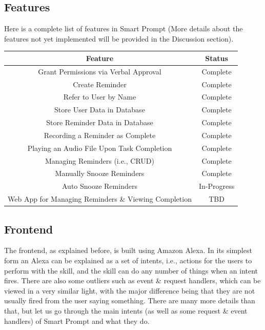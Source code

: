 \documentclass[11pt, oneside]{article}
\begin{document}
\subsection{Features}

Here is a complete list of features in Smart Prompt (More details about the features not yet implemented will be provided in the Discussion section).
\begin{center}
\begin{tabular}{| c | c |}
 \hline
 Feature & Status \\ [0.5ex] 
 \hline\hline
 Grant Permissions via Verbal Approval & Complete \\
 \hline
 Create Reminder & Complete \\
 \hline
 Refer to User by Name & Complete \\
 \hline
 Store User Data in Database & Complete \\
 \hline
 Store Reminder Data in Database & Complete \\
 \hline
 Recording a Reminder as Complete & Complete \\
 \hline
 Playing an Audio File Upon Task Completion & Complete \\
 \hline
 Managing Reminders (i.e., CRUD) & Complete \\
 \hline
 Manually Snooze Reminders & Complete \\
 \hline
 Auto Snooze Reminders & In-Progress \\
 \hline
 Web App for Managing Reminders \& Viewing Completion & TBD \\
 \hline
\end{tabular}
\end{center}

\subsection{Frontend}

The frontend, as explained before, is built using Amazon Alexa. 
In its simplest form an Alexa can be explained as a set of intents, i.e., actions for the users to perform with the skill, and the skill can do any number of things when an intent fires. 
There are also some outliers such as event \& request handlers, which can be viewed in a very similar light, with the major difference being that they are not usually fired from the user saying something. 
There are many more details than that, but let us go through the main intents (as well as some request \& event handlers) of Smart Prompt and what they do. 
\end{document}
